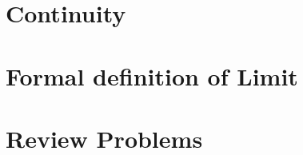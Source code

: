 \documentclass[12pt]{memoir}
\begin{document}
    \section{Continuity}
    
    \section{Formal definition of Limit}
    
    \section{Review Problems}
    
%     
%     
\end{document}
